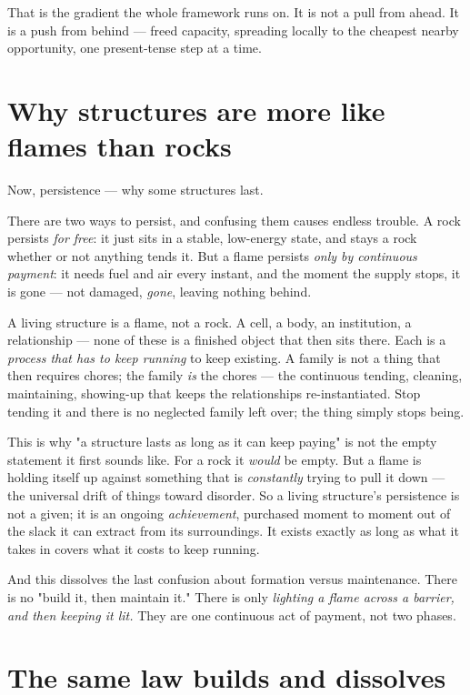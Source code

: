 \documentclass{article}
\begin{document}
That is the gradient the whole framework runs on. It is not a pull from ahead. It is a push from behind --- freed capacity, spreading locally to the cheapest nearby opportunity, one present-tense step at a time.

\section{Why structures are more like flames than rocks}

Now, persistence --- why some structures last.

There are two ways to persist, and confusing them causes endless trouble. A rock persists \textit{for free}: it just sits in a stable, low-energy state, and stays a rock whether or not anything tends it. But a flame persists \textit{only by continuous payment}: it needs fuel and air every instant, and the moment the supply stops, it is gone --- not damaged, \textit{gone}, leaving nothing behind.

A living structure is a flame, not a rock. A cell, a body, an institution, a relationship --- none of these is a finished object that then sits there. Each is a \textit{process that has to keep running} to keep existing. A family is not a thing that then requires chores; the family \textit{is} the chores --- the continuous tending, cleaning, maintaining, showing-up that keeps the relationships re-instantiated. Stop tending it and there is no neglected family left over; the thing simply stops being.

This is why "a structure lasts as long as it can keep paying" is not the empty statement it first sounds like. For a rock it \textit{would} be empty. But a flame is holding itself up against something that is \textit{constantly} trying to pull it down --- the universal drift of things toward disorder. So a living structure's persistence is not a given; it is an ongoing \textit{achievement}, purchased moment to moment out of the slack it can extract from its surroundings. It exists exactly as long as what it takes in covers what it costs to keep running.

And this dissolves the last confusion about formation versus maintenance. There is no "build it, then maintain it." There is only \textit{lighting a flame across a barrier, and then keeping it lit.} They are one continuous act of payment, not two phases.

\section{The same law builds and dissolves}
\end{document}
